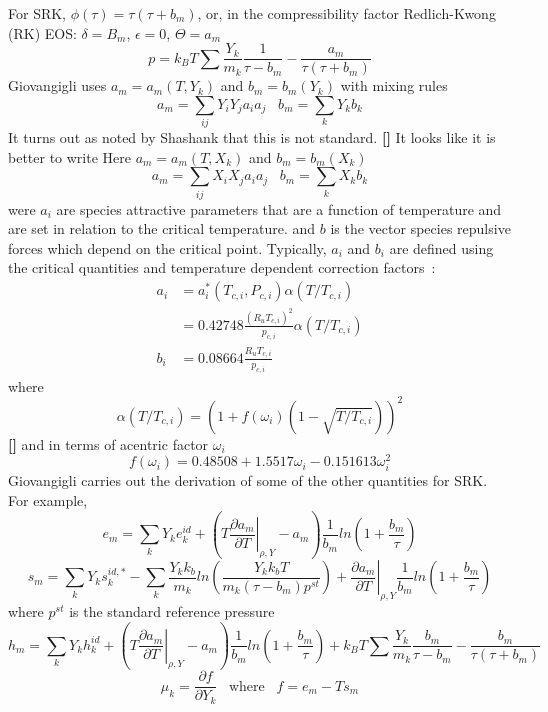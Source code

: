 \documentclass[11pt]{article}
\newcommand{\MarginPar}[1]{\marginpar{%
\vskip-\baselineskip %
\raggedright\tiny\sffamily
\hrule\smallskip{\color{red}#1}\par\smallskip\hrule}}
\newcommand{\jbb}[1]{{\bf[{\color{red}{JBB:  #1}}]}}
\begin{document}
For SRK, $\phi(\tau) = \tau(\tau+b_m)$, or, in the compressibility factor 
Redlich-Kwong (RK) EOS: $\delta = B_{m}$, $\epsilon = 0$, $\Theta = a_{m}$ \MarginPar{fix to be SRK}
\[
p = k_B T \sum \frac{Y_k}{m_k} \frac{1}{\tau - b_m} - \frac{a_m}{\tau(\tau + b_m)}
\]
Giovangigli uses $a_m = a_m(T, Y_k)$ and $b_m = b_m(Y_k)$
with mixing rules
\[
a_m = \sum_{ij} Y_i Y_j a_i a_j \;\;\;  b_m = \sum_k Y_k b_k
\]
It turns out as noted by Shashank that this is not standard. \jbb{My bad.}
It looks like it is better to write
Here $a_m = a_m(T, X_k)$ and $b_m = b_m(X_k)$
\[
a_m = \sum_{ij} X_i X_j a_i a_j \;\;\;  b_m = \sum_k X_k b_k
\]
were $a_i$ are species attractive parameters that are a function of temperature and are
set in relation to the critical temperature. and $b$ is the vector species repulsive forces which depend on the critical point.
Typically, $a_i$ and $b_i$ are defined using the critical quantities and temperature dependent correction factors~\cite{poling2001properties}:
\begin{align}
a_i &= a_i^{*}\left(T_{c,i},P_{c,i}\right) \alpha(T/T_{c,i})  \nonumber \\
       &= 0.42748 \frac{\left(R_u T_{c,i} \right)^2}{p_{c,i}} \alpha \left(T/T_{c,i}\right)  \nonumber \\
 b_i &= 0.08664 \frac{R_u T_{c,i}}{p_{c,i}}   
       \label{eq:abformEOS}
\end{align}
where
\[
\alpha(T/T_{c,i}) = \left(1 + f\left( \omega_i \right) \left(1-\sqrt{T/T_{c,i}} \right) \right)^2
\]
\jbb{One would like to use a mollified version of the $\alpha$ to smooth behavior near critical point}
and in terms of acentric factor $\omega_i$
\[
f\left( \omega_i \right) = 0.48508 + 1.5517 \omega_i - 0.151613 \omega_{i}^2
\]
Giovangigli carries out the derivation of some of the other quantities for SRK. For example,
\[
e_m = \sum_k Y_k e_k^{id} + \left( T \left . \frac{\partial a_m}{\partial T} \right |_{\rho,Y} - a_m \right)
\frac{1}{b_m} ln ( 1 + \frac{b_m}{\tau})
\]
\[
s_m = \sum_k Y_k s_k^{id,*} - \sum_k \frac{Y_k k_b}{m_k} ln  \left( \frac{Y_k k_b T}{m_k (\tau -b_m) p^{st}}   \right )
+ \left . \frac{\partial a_m}{\partial T} \right |_{\rho,Y} \frac{1}{b_m} ln ( 1 + \frac{b_m}{\tau})
\]
where $p^{st}$ is the standard reference pressure
\[
h_m = \sum_k Y_k h_k^{id} + \left ( T \left . \frac{\partial a_m}{\partial T} \right |_{\rho,Y} - a_m \right)
\frac{1}{b_m} ln ( 1 + \frac{b_m}{\tau})
+ 
k_B T \sum \frac{Y_k}{m_k} \frac{b_m}{\tau -b_m} - \frac{b_m}{\tau(\tau + b_m)}
\]
\[
\mu_k = \frac{\partial f}{\partial Y_k} \;\;\; \mathrm{where} \;\;\;  f = e_m - T s_m
\]
\end{document}
